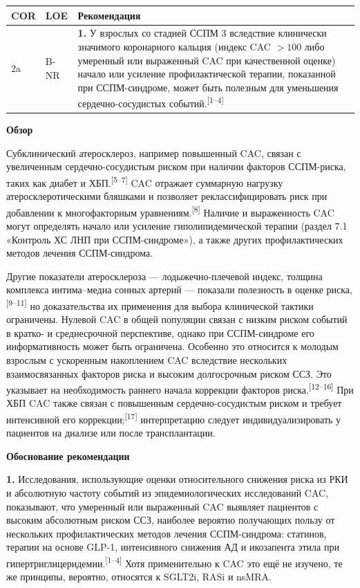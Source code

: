 \documentclass[11pt,a4paper]{article}
\newcommand{\src}[1]{\textsuperscript{[#1]}}
\newcommand{\heading}[1]{\par\medskip\textbf{#1}\par}
\begin{document}
{\small
\begin{longtable}{P{0.07\textwidth}P{0.11\textwidth}P{0.75\textwidth}}
\toprule COR & LOE & Рекомендация\\\midrule
2a & B-NR & \textbf{1.} У взрослых со стадией ССПМ 3 вследствие клинически значимого коронарного кальция (индекс CAC $>100$ либо умеренный или выраженный CAC при качественной оценке) начало или усиление профилактической терапии, показанной при ССПМ-синдроме, может быть полезным для уменьшения сердечно-сосудистых событий.\src{1--4}\\
\bottomrule
\end{longtable}
}

\heading{Обзор}
Субклинический атеросклероз, например повышенный CAC, связан с увеличенным сердечно-сосудистым риском при наличии факторов ССПМ-риска, таких как диабет и ХБП.\src{5--7} CAC отражает суммарную нагрузку атеросклеротическими бляшками и позволяет реклассифицировать риск при добавлении к многофакторным уравнениям.\src{8} Наличие и выраженность CAC могут определять начало или усиление гиполипидемической терапии (раздел 7.1 «Контроль ХС ЛНП при ССПМ-синдроме»), а также других профилактических методов лечения ССПМ-синдрома.

Другие показатели атеросклероза --- лодыжечно-плечевой индекс, толщина комплекса интима--медиа сонных артерий --- показали полезность в оценке риска,\src{9--11} но доказательства их применения для выбора клинической тактики ограничены. Нулевой CAC в общей популяции связан с низким риском событий в кратко- и среднесрочной перспективе, однако при ССПМ-синдроме его информативность может быть ограничена. Особенно это относится к молодым взрослым с ускоренным накоплением CAC вследствие нескольких взаимосвязанных факторов риска и высоким долгосрочным риском ССЗ. Это указывает на необходимость раннего начала коррекции факторов риска.\src{12--16} При ХБП CAC также связан с повышенным сердечно-сосудистым риском и требует интенсивной его коррекции;\src{17} интерпретацию следует индивидуализировать у пациентов на диализе или после трансплантации.

\heading{Обоснование рекомендации}
\textbf{1.} Исследования, использующие оценки относительного снижения риска из РКИ и абсолютную частоту событий из эпидемиологических исследований CAC, показывают, что умеренный или выраженный CAC выявляет пациентов с высоким абсолютным риском ССЗ, наиболее вероятно получающих пользу от нескольких профилактических методов лечения ССПМ-синдрома: статинов, терапии на основе GLP-1, интенсивного снижения АД и икозапента этила при гипертриглицеридемии.\src{1--4} Хотя применительно к CAC это ещё не изучено, те же принципы, вероятно, относятся к SGLT2i, RASi и nsMRA.
\end{document}
